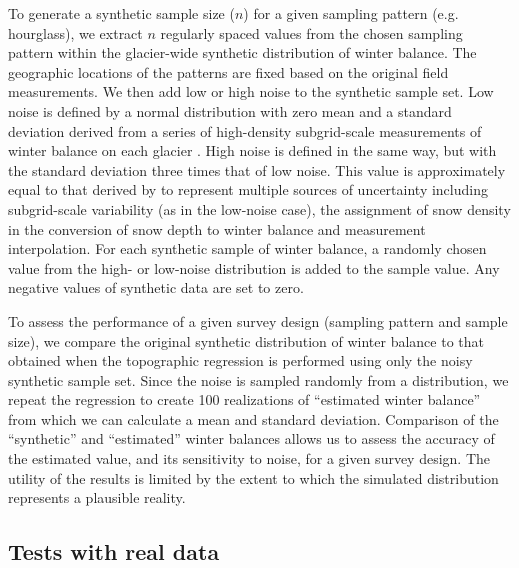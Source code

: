 \documentclass[twocolumn,letterpaper]{igs}
\begin{document}
To generate a synthetic sample size ($n$) for a given sampling pattern (e.g. hourglass), we extract $n$ regularly spaced values from the chosen sampling pattern within the glacier-wide synthetic distribution of winter balance. 
The geographic locations of the patterns are fixed based on the original field measurements.    
We then add low or high noise to the synthetic sample set. Low noise is defined by a normal distribution with zero mean and a standard deviation derived from a series of high-density subgrid-scale measurements of winter balance on each glacier \citep{Pulwicki2017}.  
High noise is defined in the same way, but with the standard deviation three times that of low noise. This value is approximately equal to that derived by \citet{Pulwicki2017} to represent multiple sources of uncertainty including subgrid-scale variability (as in the low-noise case), the assignment of snow density in the conversion of snow depth to winter balance and measurement interpolation.
For each synthetic sample of winter balance, a randomly chosen value from the high- or low-noise distribution is added to the sample value. Any negative values of synthetic data are set to zero. 

To assess the performance of a given survey design (sampling pattern and sample size), we compare the original synthetic distribution of winter balance to that obtained when the topographic regression is performed using only the noisy synthetic sample set. 
Since the noise is sampled randomly from a distribution, we repeat the regression to create 100 realizations of ``estimated winter balance'' from which we can calculate a mean and standard deviation. Comparison of the ``synthetic'' and ``estimated'' winter balances allows us to assess the accuracy of the estimated value, and its sensitivity to noise, for a given survey design. 
The utility of the results is limited by the extent to which the simulated distribution represents a plausible reality.   
 
 \subsection{Tests with real data}
 
\end{document}
